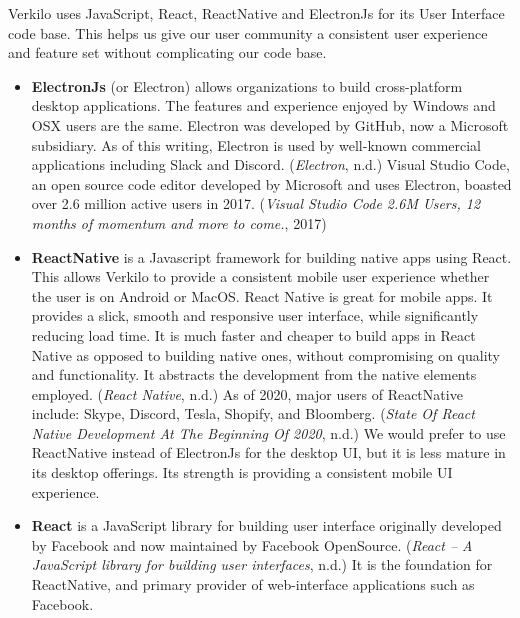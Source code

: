 \documentclass[11pt,openany]{book}
\providecommand{\tightlist}{%
  \setlength{\itemsep}{0pt}\setlength{\parskip}{0pt}}
\begin{document}
Verkilo uses JavaScript, React, ReactNative and ElectronJs for its User
Interface code base. This helps us give our user community a consistent
user experience and feature set without complicating our code base.

\begin{itemize}
\tightlist
\item
  \textbf{ElectronJs} (or Electron) allows organizations to build
  cross-platform desktop applications. The features and experience
  enjoyed by Windows and OSX users are the same. Electron was developed
  by GitHub, now a Microsoft subsidiary. As of this writing, Electron is
  used by well-known commercial applications including Slack and
  Discord. (\emph{Electron}, n.d.) Visual Studio Code, an open source
  code editor developed by Microsoft and uses Electron, boasted over 2.6
  million active users in 2017. (\emph{Visual Studio Code 2.6M Users, 12
  months of momentum and more to come.}, 2017)
\item
  \textbf{ReactNative} is a Javascript framework for building native
  apps using React. This allows Verkilo to provide a consistent mobile
  user experience whether the user is on Android or MacOS. React Native
  is great for mobile apps. It provides a slick, smooth and responsive
  user interface, while significantly reducing load time. It is much
  faster and cheaper to build apps in React Native as opposed to
  building native ones, without compromising on quality and
  functionality. It abstracts the development from the native elements
  employed. (\emph{React Native}, n.d.) As of 2020, major users of
  ReactNative include: Skype, Discord, Tesla, Shopify, and Bloomberg.
  (\emph{State Of React Native Development At The Beginning Of 2020},
  n.d.) We would prefer to use ReactNative instead of ElectronJs for the
  desktop UI, but it is less mature in its desktop offerings. Its
  strength is providing a consistent mobile UI experience.
\item
  \textbf{React} is a JavaScript library for building user interface
  originally developed by Facebook and now maintained by Facebook
  OpenSource. (\emph{React -- A JavaScript library for building user
  interfaces}, n.d.) It is the foundation for ReactNative, and primary
  provider of web-interface applications such as Facebook.
\end{itemize}
\end{document}

